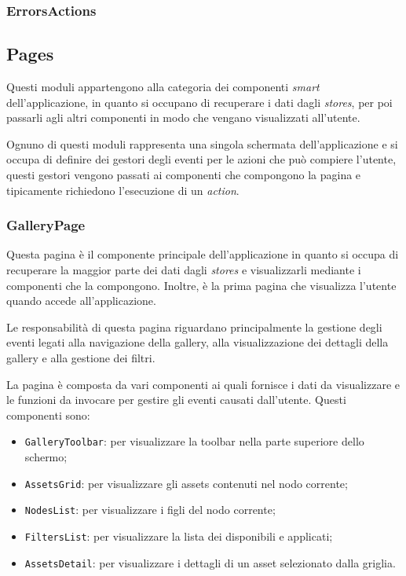 \subsubsection{ErrorsActions}



\subsection{Pages}

Questi moduli appartengono alla categoria dei componenti \textit{smart} dell'applicazione, in quanto si occupano di recuperare i dati dagli \textit{stores}, per poi passarli agli altri componenti in modo che vengano visualizzati all'utente.

Ognuno di questi moduli rappresenta una singola schermata dell'applicazione e si occupa di definire dei gestori degli eventi per le azioni che può compiere l'utente, questi gestori vengono passati ai componenti che compongono la pagina e tipicamente richiedono l'esecuzione di un \textit{action}.

\subsubsection{GalleryPage}

Questa pagina è il componente principale dell'applicazione in quanto si occupa di recuperare la maggior parte dei dati dagli \textit{stores} e visualizzarli mediante i componenti che la compongono. Inoltre, è la prima pagina che visualizza l'utente quando accede all'applicazione.

Le responsabilità di questa pagina riguardano principalmente la gestione degli eventi legati alla navigazione della gallery, alla visualizzazione dei dettagli della gallery e alla gestione dei filtri.

La pagina è composta da vari componenti ai quali fornisce i dati da visualizzare e le funzioni da invocare per gestire gli eventi causati dall'utente.
Questi componenti sono:
\begin{itemize}
\item \texttt{GalleryToolbar}: per visualizzare la toolbar nella parte superiore dello schermo;
\item \texttt{AssetsGrid}: per visualizzare gli assets contenuti nel nodo corrente;
\item \texttt{NodesList}: per visualizzare i figli del nodo corrente;
\item \texttt{FiltersList}: per visualizzare la lista dei disponibili e applicati;
\item \texttt{AssetsDetail}: per visualizzare i dettagli di un asset selezionato dalla griglia.
\end{itemize}

